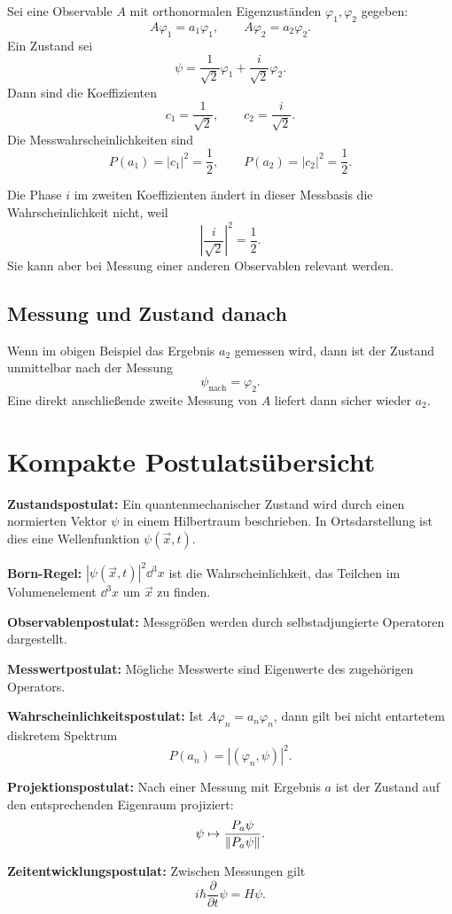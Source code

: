 Sei eine Observable $A$ mit orthonormalen Eigenzuständen $\varphi_1,\varphi_2$ gegeben:
\[
    A\varphi_1=a_1\varphi_1,
    \qquad
    A\varphi_2=a_2\varphi_2.
\]
Ein Zustand sei
\[
    \psi=\frac{1}{\sqrt{2}}\varphi_1+\frac{i}{\sqrt{2}}\varphi_2.
\]
Dann sind die Koeffizienten
\[
    c_1=\frac{1}{\sqrt{2}},
    \qquad
    c_2=\frac{i}{\sqrt{2}}.
\]
Die Messwahrscheinlichkeiten sind
\[
    P(a_1)=|c_1|^2=\frac12,
    \qquad
    P(a_2)=|c_2|^2=\frac12.
\]

\begin{answerbox}
Die Phase $i$ im zweiten Koeffizienten ändert in dieser Messbasis die Wahrscheinlichkeit nicht, weil
\[
    \left|\frac{i}{\sqrt{2}}\right|^2=\frac12.
\]
Sie kann aber bei Messung einer anderen Observablen relevant werden.
\end{answerbox}

\subsection{Messung und Zustand danach}

Wenn im obigen Beispiel das Ergebnis $a_2$ gemessen wird, dann ist der Zustand unmittelbar nach der Messung
\[
    \psi_{\text{nach}}=\varphi_2.
\]
Eine direkt anschließende zweite Messung von $A$ liefert dann sicher wieder $a_2$.

\section{Kompakte Postulatsübersicht}

\begin{notebox}
\textbf{Zustandspostulat:}
Ein quantenmechanischer Zustand wird durch einen normierten Vektor $\psi$ in einem Hilbertraum beschrieben. In Ortsdarstellung ist dies eine Wellenfunktion $\psi(\vec{x},t)$.

\textbf{Born-Regel:}
$|\psi(\vec{x},t)|^2\dd^3x$ ist die Wahrscheinlichkeit, das Teilchen im Volumenelement $\dd^3x$ um $\vec{x}$ zu finden.

\textbf{Observablenpostulat:}
Messgrößen werden durch selbstadjungierte Operatoren dargestellt.

\textbf{Messwertpostulat:}
Mögliche Messwerte sind Eigenwerte des zugehörigen Operators.

\textbf{Wahrscheinlichkeitspostulat:}
Ist $A\varphi_n=a_n\varphi_n$, dann gilt bei nicht entartetem diskretem Spektrum
\[
    P(a_n)=|(\varphi_n,\psi)|^2.
\]

\textbf{Projektionspostulat:}
Nach einer Messung mit Ergebnis $a$ ist der Zustand auf den entsprechenden Eigenraum projiziert:
\[
    \psi\mapsto \frac{P_a\psi}{\left\lVert P_a\psi \right\rVert}.
\]

\textbf{Zeitentwicklungspostulat:}
Zwischen Messungen gilt
\[
    i\hbar\frac{\partial}{\partial t}\psi=H\psi.
\]
\end{notebox}

